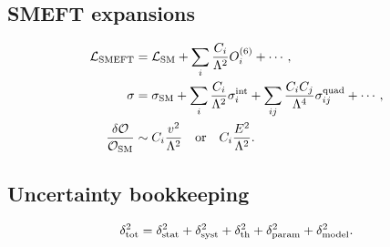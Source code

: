 \documentclass[11pt,a4paper]{article}
\newcommand{\Lag}{\mathcal{L}}
\newcommand{\SM}{\mathrm{SM}}
\newcommand{\SMEFT}{\mathrm{SMEFT}}
\numberwithin{equation}{section}
\begin{document}
\subsection{SMEFT expansions}
\begin{align}
  \Lag_{\SMEFT}&=\Lag_{\SM}+\sum_i\frac{C_i}{\Lambda^2}O_i^{(6)}+\cdots,\\
  \sigma&=\sigma_{\SM}+\sum_i\frac{C_i}{\Lambda^2}\sigma_i^{\rm int}
  +\sum_{ij}\frac{C_iC_j}{\Lambda^4}\sigma_{ij}^{\rm quad}+\cdots,\\
  \frac{\delta\mathcal O}{\mathcal O_{\SM}}&\sim C_i\frac{v^2}{\Lambda^2}\quad\text{or}\quad C_i\frac{E^2}{\Lambda^2}.
\end{align}

\subsection{Uncertainty bookkeeping}
\begin{equation}
  \delta_{\rm tot}^2=\delta_{\rm stat}^2+\delta_{\rm syst}^2+\delta_{\rm th}^2+\delta_{\rm param}^2+\delta_{\rm model}^2 .
\end{equation}

\newpage
\end{document}
